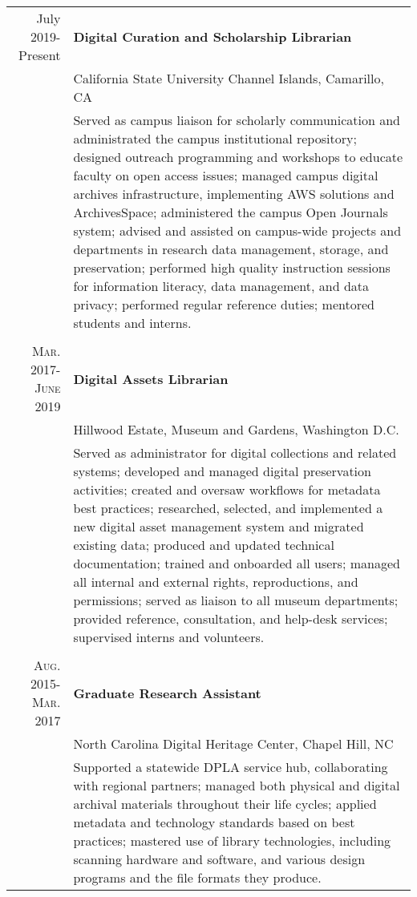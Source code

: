 \documentclass[a4paper,10pt]{article}
\begin{document}
\begin{tabular}{r|p{11cm}}
 {July 2019- Present} & \textbf{Digital Curation and Scholarship Librarian}\\
 &California State University Channel Islands, Camarillo, CA \\
 &\footnotesize{
Served as campus liaison for scholarly communication and administrated the campus institutional repository; designed outreach programming and workshops to educate faculty on open access issues; managed campus digital archives infrastructure, implementing AWS solutions and ArchivesSpace; administered the campus Open Journals system; advised and assisted on campus-wide projects and departments in research data management, storage, and preservation; performed high quality instruction sessions for information literacy, data management, and data privacy; performed regular reference duties; mentored students and interns.
 }\\\multicolumn{2}{c}{} \\
 
 \textsc {Mar. 2017- June 2019} & \textbf{Digital Assets Librarian}\\
 &Hillwood Estate, Museum and Gardens, Washington D.C. \\
 &\footnotesize{
 Served as administrator for digital collections and related systems;  developed and managed digital preservation activities; created and oversaw workflows for metadata best practices; researched, selected, and implemented a new digital asset management system and migrated existing data; produced and updated technical documentation; trained and onboarded all users; managed all internal and external rights, reproductions, and permissions; served as liaison to all museum departments; provided reference, consultation, and help-desk services; supervised interns and volunteers.
 }\\\multicolumn{2}{c}{} \\
 
 \textsc{Aug. 2015- Mar. 2017} & \textbf{Graduate Research Assistant}\\
&North Carolina Digital Heritage Center, Chapel Hill, NC\\
&\footnotesize{
Supported a statewide DPLA service hub, collaborating with regional partners; managed both physical and digital archival materials throughout their life cycles; applied metadata and technology standards based on best practices; mastered use of library technologies, including scanning hardware and software, and various design programs and the file formats they produce.
} \multicolumn{2}{c}{} \\
 

\end{tabular}
\end{document}
